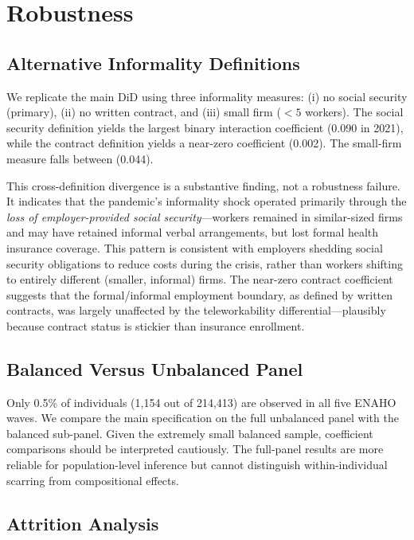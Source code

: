 \section{Robustness}
\label{sec:robustness}

\subsection{Alternative Informality Definitions}

We replicate the main DiD using three informality measures: (i) no social security (primary), (ii) no written contract, and (iii) small firm ($< 5$ workers). The social security definition yields the largest binary interaction coefficient (0.090 in 2021), while the contract definition yields a near-zero coefficient (0.002). The small-firm measure falls between (0.044).

This cross-definition divergence is a substantive finding, not a robustness failure. It indicates that the pandemic's informality shock operated primarily through the \textit{loss of employer-provided social security}---workers remained in similar-sized firms and may have retained informal verbal arrangements, but lost formal health insurance coverage. This pattern is consistent with employers shedding social security obligations to reduce costs during the crisis, rather than workers shifting to entirely different (smaller, informal) firms. The near-zero contract coefficient suggests that the formal/informal employment boundary, as defined by written contracts, was largely unaffected by the teleworkability differential---plausibly because contract status is stickier than insurance enrollment.

\subsection{Balanced Versus Unbalanced Panel}

Only 0.5\% of individuals (1,154 out of 214,413) are observed in all five ENAHO waves. We compare the main specification on the full unbalanced panel with the balanced sub-panel. Given the extremely small balanced sample, coefficient comparisons should be interpreted cautiously. The full-panel results are more reliable for population-level inference but cannot distinguish within-individual scarring from compositional effects.

\subsection{Attrition Analysis}

